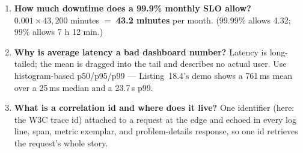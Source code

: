\begin{enumerate}[label=\textbf{Q\arabic*.}, leftmargin=1.6cm]
        A measurable target on a service level indicator over a rolling
        window --- e.g.\ ``99.9\% of requests succeed over 30 days'' ---
        against which you define an error budget and alerting.
  \item \textbf{How much downtime does a 99.9\% monthly SLO allow?}
        $0.001 \times 43{,}200$ minutes $=$ \textbf{43.2 minutes} per
        month. (99.99\% allows 4.32; 99\% allows 7 h 12 min.)
  \item \textbf{Why is average latency a bad dashboard number?}
        Latency is long-tailed; the mean is dragged into the tail and
        describes no actual user. Use histogram-based p50/p95/p99 ---
        Listing~18.4's demo shows a 761\,ms mean over a 25\,ms median and
        a 23.7\,s p99.
  \item \textbf{What is a correlation id and where does it live?}
        One identifier (here: the W3C trace id) attached to a request at
        the edge and echoed in every log line, span, metric exemplar, and
        problem-details response, so one id retrieves the request's whole
        story.
\end{enumerate}

